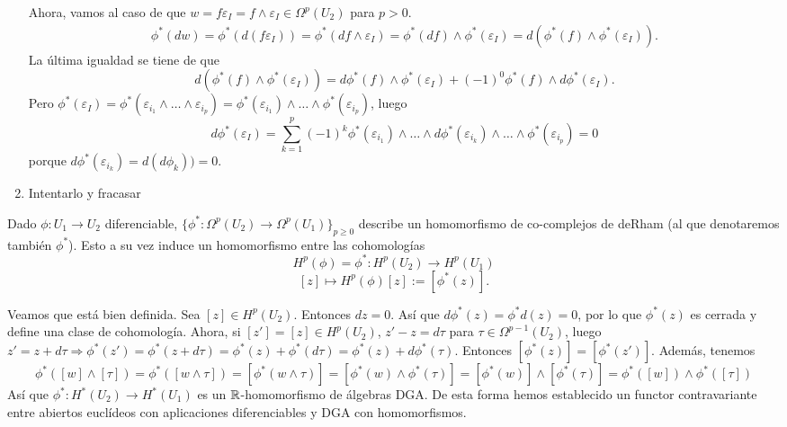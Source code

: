\documentclass[CV.tex]{subfiles}
\begin{document}
\begin{dem}
\begin{enumerate}
Ahora, vamos al caso de que $w=f\varepsilon_I=f\land\varepsilon_I\in\Omega^p(U_2)$ para $p>0$. 
\begin{gather*}
\phi^*(dw)=\phi^*(d(f\varepsilon_I))=\phi^*(df\land\varepsilon_I)=\phi^*(df)\land\phi^*(\varepsilon_I)=d(\phi^*(f)\land\phi^*(\varepsilon_I)).
\end{gather*}
La última igualdad se tiene de que
\[
d(\phi^*(f)\land\phi^*(\varepsilon_I))=d\phi^*(f)\land\phi^*(\varepsilon_I)+(-1)^0\phi^*(f)\land d\phi^*(\varepsilon_I).
\]
Pero $\phi^*(\varepsilon_I)=\phi^*(\varepsilon_{i_1}\land\dots\land\varepsilon_{i_p})=\phi^*(\varepsilon_{i_1})\land\dots\land\phi^*(\varepsilon_{i_p})$, luego
\[
d\phi^*(\varepsilon_I)=\sum_{k=1}^p(-1)^k\phi^*(\varepsilon_{i_1})\land\dots\land d\phi^*(\varepsilon_{i_k})\land\dots\land \phi^*(\varepsilon_{i_p})=0
\]
porque $d\phi^*(\varepsilon_{i_k})=d(d\phi_k))=0$.

\item Intentarlo y fracasar
\end{enumerate}
\QED
\end{dem}

Dado $\phi:U_1\to U_2$ diferenciable, $\{\phi^*:\Omega^p(U_2)\to\Omega^p(U_1)\}_{p\geq 0}$ describe un homomorfismo de co-complejos de deRham (al que denotaremos también $\phi^*$). Esto a su vez induce un homomorfismo entre las cohomologías
\[
H^p(\phi)=\phi^*:H^p(U_2)\to H^p(U_1)
\]
\[
[z]\mapsto H^p(\phi)[z]:=[\phi^*(z)].
\]

Veamos que está bien definida. Sea $[z]\in H^p(U_2)$. Entonces $dz=0$. Así que $d\phi^*(z)=\phi^*d(z)=0$, por lo que $\phi^*(z)$ es cerrada y define una clase de cohomología. Ahora, si $[z']=[z]\in H^p(U_2)$, $z'-z=d\tau$ para $\tau\in\Omega^{p-1}(U_2)$, luego $z'=z+d\tau\Rightarrow \phi^*(z')=\phi^*(z+d\tau)=\phi^*(z)+\phi^*(d\tau)=\phi^*(z)+d\phi^*(\tau)$. Entonces $[\phi^*(z)]=[\phi^*(z')]$. Además, tenemos
\[
\phi^*([w]\land[\tau])=\phi^*([w\land\tau])=[\phi^*(w\land\tau)]=[\phi^*(w)\land\phi^*(\tau)]=[\phi^*(w)]\land[\phi^*(\tau)]=\phi^*([w])\land\phi^*([\tau])
\]
Así que $\phi^*:H^*(U_2)\to H^*(U_1)$ es un $\mathbb{R}$-homomorfismo de álgebras DGA. De esta forma hemos establecido un functor contravariante entre abiertos euclídeos con aplicaciones diferenciables y  DGA con homomorfismos.
\end{document}

